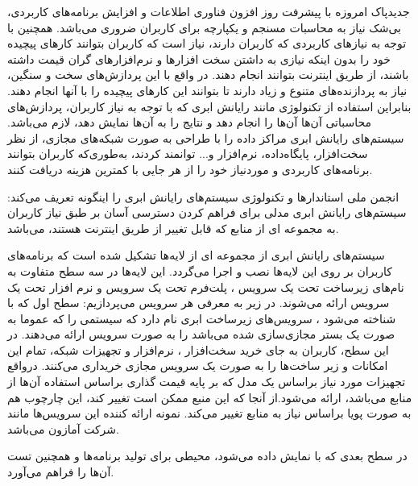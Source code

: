 ‌جدید‌پاک
 امروزه با پیشرفت روز افزون فناوری اطلاعات و افزایش برنامه‌های کاربردی، 
 بی‌شک نیاز به محاسبات مسنجم و یکپارچه برای کاربران ضروری می‌باشد.
 همچنین با توجه به نیازهای کاربردی که کاربران دارند، 
 نیاز است که کاربران بتوانند کارهای پیچیده خود را بدون  اینکه 
 نیازی به داشتن سخت افزارها و نرم‌افزارهای گران قیمت داشته باشند، 
 از طریق اینترنت بتوانند انجام دهند. در واقع با این پردازش‌های سخت و سنگین، 
 نیاز به پردازنده‌های متنوع و زیاد دارند تا بتوانند این کارهای پیچیده را با آنها انجام دهند. بنابراین استفاده از تکنولوژی مانند رایانش ابری که با توجه به نیاز کاربران، پردازش‌های محاسباتی آن‌ها آن‌ها را انجام دهد و نتایج را به آن‌ها 
 نمایش دهد، لازم می‌باشد. سیستم‌های رایانش ابری مراکز داده را با طراحی به صورت شبکه‌های مجازی، از نظر سخت‌افزار، پایگاه‌داده، نرم‌افزار و... توانمند کردند، 
 به‌طوری‌که کاربران بتوانند برنامه‌های کاربردی و موردنیاز خود را از هر جایی  با کمترین هزینه دریافت کنند.
  \cite{define,num2}
  
  انجمن ملی استاندارها و تکنولوژی سیستم‌های رایانش ابری را اینگونه تعریف می‌کند: سیستم‌های رایانش ابری مدلی برای فراهم کردن دسترسی آسان بر طبق نیاز کاربران به مجموعه ای از منابع که قابل تغییر از طریق اینترنت هستند، می‌باشد.
  \cite{define}


   سیستم‌های رایانش ابری از مجموعه ای از لایه‌ها تشکیل شده است که برنامه‌های کاربران بر روی این لایه‌ها نصب و اجرا می‌گردد. این لایه‌ها در سه سطح متفاوت به نام‌های زیرساخت تحت یک سرویس
    ، پلت‌فرم تحت یک سرویس
     و نرم ‌افزار تحت یک سرویس
     ارائه می‌شوند. در زیر به معرفی هر سرویس می‌پردازیم:
 سطح اول که با 
 شناخته می‌شود ، سرویس‌های زیرساخت ابری نام دارد که سیستمی‌ را که عموما به صورت یک بستر مجازی‌سازی شده می‌باشد را به صورت سرویس ارائه می‌دهند. در این سطح، کاربران به جای خرید سخت‌افزار ، نرم‌افزار و تجهیزات شبکه، تمام این امکانات و زیر ساخت‌ها را به صورت یک سرویس مجازی خریداری می‌کنند. درواقع تجهیزات مورد نیاز براساس یک مدل که بر پایه قیمت گذاری براساس استفاده آن‌ها از منابع می‌باشد، ارائه می‌شود.از آنجا که این منبع ممکن است تغییر کند، این چارچوب هم به صورت پویا براساس نیاز به منابع تغییر می‌کند. نمونه ارائه کننده این سرویس‌ها مانند شرکت آمازون می‌باشد.
   
 در سطح بعدی که با 
  نمایش داده می‌شود، محیطی برای تولید برنامه‌ها و همچنین تست آن‌ها  را فراهم می‌آورد. 
  

